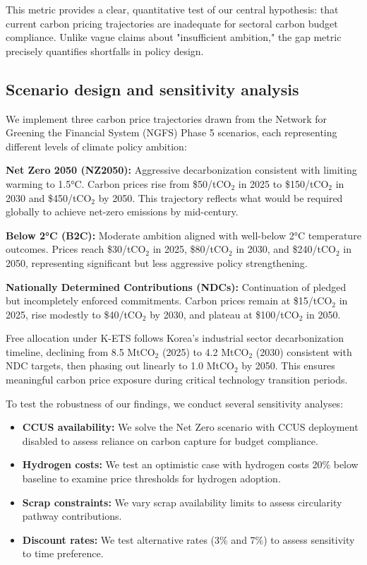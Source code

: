 \documentclass[preprint,1p,authoryear]{elsarticle}
\begin{document}
This metric provides a clear, quantitative test of our central hypothesis: that current carbon pricing trajectories are inadequate for sectoral carbon budget compliance. Unlike vague claims about "insufficient ambition," the gap metric precisely quantifies shortfalls in policy design.

\subsection{Scenario design and sensitivity analysis}

We implement three carbon price trajectories drawn from the Network for Greening the Financial System (NGFS) Phase 5 scenarios, each representing different levels of climate policy ambition:

\textbf{Net Zero 2050 (NZ2050):} Aggressive decarbonization consistent with limiting warming to 1.5°C. Carbon prices rise from \$50/tCO$_2$ in 2025 to \$150/tCO$_2$ in 2030 and \$450/tCO$_2$ by 2050. This trajectory reflects what would be required globally to achieve net-zero emissions by mid-century.

\textbf{Below 2°C (B2C):} Moderate ambition aligned with well-below 2°C temperature outcomes. Prices reach \$30/tCO$_2$ in 2025, \$80/tCO$_2$ in 2030, and \$240/tCO$_2$ in 2050, representing significant but less aggressive policy strengthening.

\textbf{Nationally Determined Contributions (NDCs):} Continuation of pledged but incompletely enforced commitments. Carbon prices remain at \$15/tCO$_2$ in 2025, rise modestly to \$40/tCO$_2$ by 2030, and plateau at \$100/tCO$_2$ in 2050.

Free allocation under K-ETS follows Korea's industrial sector decarbonization timeline, declining from 8.5 MtCO$_2$ (2025) to 4.2 MtCO$_2$ (2030) consistent with NDC targets, then phasing out linearly to 1.0 MtCO$_2$ by 2050. This ensures meaningful carbon price exposure during critical technology transition periods.

To test the robustness of our findings, we conduct several sensitivity analyses:
\begin{itemize}[leftmargin=*]
  \item \textbf{CCUS availability:} We solve the Net Zero scenario with CCUS deployment disabled to assess reliance on carbon capture for budget compliance.
  \item \textbf{Hydrogen costs:} We test an optimistic case with hydrogen costs 20\% below baseline to examine price thresholds for hydrogen adoption.
  \item \textbf{Scrap constraints:} We vary scrap availability limits to assess circularity pathway contributions.
  \item \textbf{Discount rates:} We test alternative rates (3\% and 7\%) to assess sensitivity to time preference.
\end{itemize}
\end{document}
